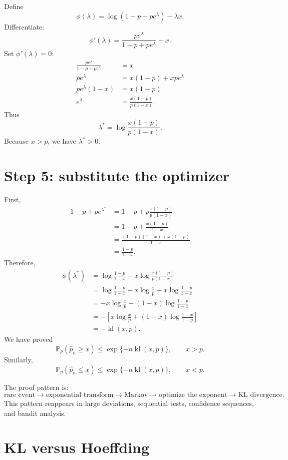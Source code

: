 \documentclass[en,nofont,11pt]{elegantbook}
\newcommand{\Pbb}{\mathbb{P}}
\newcommand{\kl}{\operatorname{kl}}
\begin{document}
Define
\[
\phi(\lambda)
=
\log(1-p+pe^\lambda)-\lambda x.
\]
Differentiate:
\[
\phi'(\lambda)
=
\frac{pe^\lambda}{1-p+pe^\lambda}-x.
\]
Set $\phi'(\lambda)=0$:
\begin{align*}
\frac{pe^\lambda}{1-p+pe^\lambda}
&=x\\
pe^\lambda
&=x(1-p)+xpe^\lambda\\
pe^\lambda(1-x)
&=x(1-p)\\
e^\lambda
&=
\frac{x(1-p)}{p(1-x)}.
\end{align*}
Thus
\[
\lambda^*
=
\log\frac{x(1-p)}{p(1-x)}.
\]
Because $x>p$, we have $\lambda^*>0$.

\section{Step 5: substitute the optimizer}

First,
\begin{align*}
1-p+pe^{\lambda^*}
&=
1-p+p\frac{x(1-p)}{p(1-x)}\\
&=
1-p+\frac{x(1-p)}{1-x}\\
&=
\frac{(1-p)(1-x)+x(1-p)}{1-x}\\
&=
\frac{1-p}{1-x}.
\end{align*}
Therefore,
\begin{align*}
\phi(\lambda^*)
&=
\log\frac{1-p}{1-x}
-x\log\frac{x(1-p)}{p(1-x)}\\
&=
\log\frac{1-p}{1-x}
-x\log\frac{x}{p}
-x\log\frac{1-p}{1-x}\\
&=
-x\log\frac{x}{p}
+(1-x)\log\frac{1-p}{1-x}\\
&=
-\left[
 x\log\frac{x}{p}
 +(1-x)\log\frac{1-x}{1-p}
\right]\\
&=
-\kl(x,p).
\end{align*}
We have proved
\[
\boxed{
\Pbb_p(\widehat p_n\ge x)
\le
\exp\{-n\kl(x,p)\},
\qquad x>p.
}
\]
Similarly,
\[
\boxed{
\Pbb_p(\widehat p_n\le x)
\le
\exp\{-n\kl(x,p)\},
\qquad x<p.
}
\]

\begin{patternbox}
The proof pattern is:
\[
\text{rare event}
\to
\text{exponential transform}
\to
\text{Markov}
\to
\text{optimize the exponent}
\to
\text{KL divergence}.
\]
This pattern reappears in large deviations, sequential tests, confidence sequences, and bandit analysis.
\end{patternbox}

\section{KL versus Hoeffding}
\end{document}

